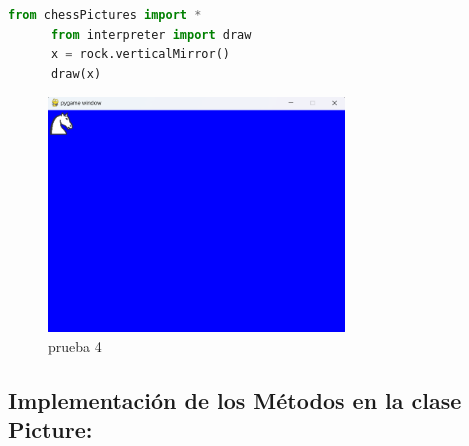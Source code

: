\documentclass{article}
\begin{document}
\begin{itemize}
\begin{lstlisting}[language=Python, caption=Código de prueba Python]
      from chessPictures import *
      from interpreter import draw
      x = rock.verticalMirror()
      draw(x)
    \end{lstlisting}
    \begin{figure}[H]
      \centering
      \includegraphics[width=0.7\textwidth, keepaspectratio]{img/vertical.png}
      \caption{prueba 4}
    \end{figure}
  \end{itemize}
  

  \subsection{Implementación de los Métodos en la clase Picture:}
  
\end{document}
